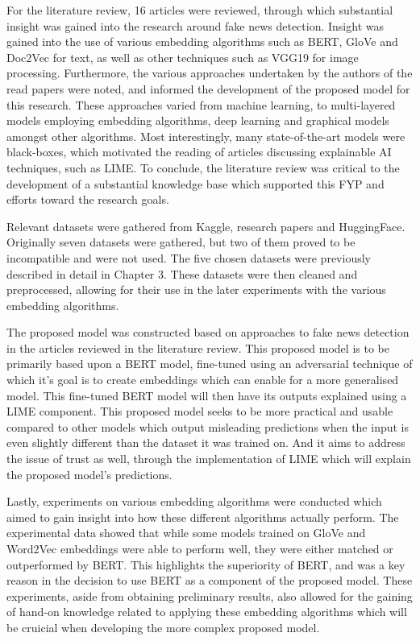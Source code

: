 \documentclass[stu,12pt,floatsintext,donotrepeattitle]{apa7}
\begin{document}
For the literature review, 16 articles were reviewed, through which substantial insight was gained into the research around fake news detection. Insight was gained into the use of various embedding algorithms such as BERT, GloVe and Doc2Vec for text, as well as other techniques such as VGG19 for image processing. Furthermore, the various approaches undertaken by the authors of the read papers were noted, and informed the development of the proposed model for this research. These approaches varied from machine learning, to multi-layered models employing embedding algorithms, deep learning and graphical models amongst other algorithms. Most interestingly, many state-of-the-art models were black-boxes, which motivated the reading of articles discussing explainable AI techniques, such as LIME. To conclude, the literature review was critical to the development of a substantial knowledge base which supported this FYP and efforts toward the research goals.

Relevant datasets were gathered from Kaggle, research papers and HuggingFace. Originally seven datasets were gathered, but two of them proved to be incompatible and were not used. The five chosen datasets were previously described in detail in Chapter 3. These datasets were then cleaned and preprocessed, allowing for their use in the later experiments with the various embedding algorithms.

The proposed model was constructed based on approaches to fake news detection in the articles reviewed in the literature review. This proposed model is to be primarily based upon a BERT model, fine-tuned using an adversarial technique of which it's goal is to create embeddings which can enable for a more generalised model. This fine-tuned BERT model will then have its outputs explained using a LIME component. This proposed model seeks to be more practical and usable compared to other models which output misleading predictions when the input is even slightly different than the dataset it was trained on. And it aims to address the issue of trust as well, through the implementation of LIME which will explain the proposed model's predictions.

Lastly, experiments on various embedding algorithms were conducted which aimed to gain insight into how these different algorithms actually perform. The experimental data showed that while some models trained on GloVe and Word2Vec embeddings were able to perform well, they were either matched or outperformed by BERT. This highlights the superiority of BERT, and was a key reason in the decision to use BERT as a component of the proposed model. These experiments, aside from obtaining preliminary results, also allowed for the gaining of hand-on knowledge related to applying these embedding algorithms which will be cruicial when developing the more complex proposed model.
\end{document}
